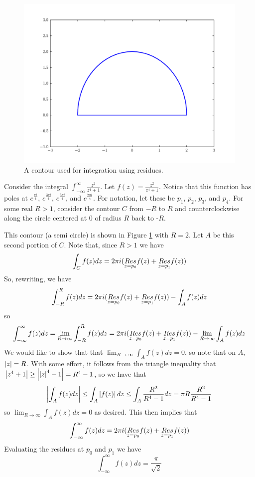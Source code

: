 \begin{figure}
\includegraphics[width=\textwidth]{contour1.pdf}
\caption{A contour used for integration using residues.}
\label{complexint:c1}
\end{figure}

Consider the integral $\int_{-\infty}^{\infty}\frac{z^2}{z^4+1}$.
Let $f(z)=\frac{z^2}{z^4+1}$.
Notice that this function has poles at $e^{\frac{\pi i}{4}}$, $e^{\frac{3\pi i}{4}}$, $e^{\frac{5\pi i}{4}}$, and $e^{\frac{7\pi i}{4}}$.
For notation, let these be $p_1$, $p_2$, $p_3$, and $p_4$.
For some real $R>1$, consider the contour $C$ from $-R$ to $R$ and counterclockwise along the circle centered at $0$ of radius $R$ back to -$R$.

This contour (a semi circle) is shown in Figure \ref{complexint:c1} with $R = 2$.
Let $A$ be this second portion of $C$.
Note that, since $R>1$ we have
\[\int_C f(z)dz = 2\pi i (\underset{z=p_0}{Res} f(z) +\underset{z=p_1}{Res} f(z))\]
So, rewriting, we have
\[\int_{-R}^R f(z) dz = 2\pi i (\underset{z=p_0}{Res} f(z) +\underset{z=p_1}{Res} f(z)) - \int_A f(z) dz\]
so
\[\int_{-\infty}^{\infty} f(z) dz = \lim_{R\to \infty} \int_{-R}^R f(z) dz = 2\pi i (\underset{z=p_0}{Res} f(z) +\underset{z=p_1}{Res} f(z)) - \lim_{R\to \infty} \int_A f(z) dz\]
We would like to show that that $\lim_{R\to\infty} \int_A f(z) dz = 0$, so note that on $A$, $\left\lvert z\right\rvert=R$.
With some effort, it follows from the triangle inequality that $\left\lvert z^4+1\right\rvert\geq \left\lvert\left\lvert z\right\rvert^4-1\right\rvert = R^4 -1$, so we have that
\[\left\lvert\int_A f(z) dz\right\rvert\leq \int_A \left\lvert f(z)\right\rvert dz \leq \int_A \frac{R^2}{R^4 -1}dz = \pi R \frac{R^2}{R^4-1}\]
so $\lim_{R\to\infty} \int_A f(z) dz = 0$ as desired.
This then implies that
\[\int_{-\infty}^{\infty} f(z) dz = 2\pi i (\underset{z=p_0}{Res} f(z) +\underset{z=p_1}{Res} f(z))\]
Evaluating the residues at $p_0$ and $p_1$ we have
\[\int_{-\infty}^{\infty} f(z) dz = \frac{\pi}{\sqrt{2}}\]

